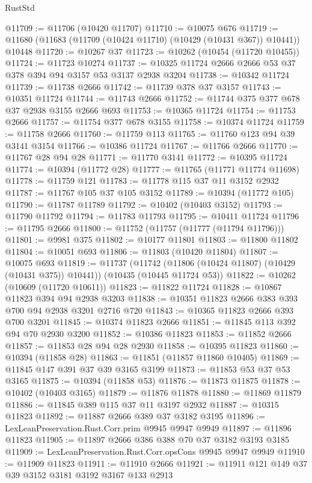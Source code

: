 \begin{lexlean}{RustStd}
\begin{coremodule}
{\begin{coremodule}
{{{{{{{{{{{{{{{{{{{{{{{{{{{{{{{{{{{{{{{{{{{{{{{{{{{{{{{{{{{{{{{{{{{{{{{{{{{{{{@11709 := @11706 (@10420 @11707)
@11710 := @10075 @676
@11719 := @11680 (@11683 (@11709 (@10424 @11710) (@10429 (@10431 @367)) @10441)) @10448
@11720 := @10267 @37
@11723 := @10262 (@10454 (@11720 @10455))
@11724 := @11723 @10274
@11737 := @10325 @11724 @2666 @2666 @53 @37 @378 @394 @94 @3157 @53 @3137 @2938 @3204
@11738 := @10342 @11724
@11739 := @11738 @2666
@11742 := @11739 @378 @37 @3157
@11743 := @10351 @11724
@11744 := @11743 @2666
@11752 := @11744 @375 @377 @678 @37 @2938 @3155 @2666 @693
@11753 := @10365 @11724
@11754 := @11753 @2666
@11757 := @11754 @377 @678 @3155
@11758 := @10374 @11724
@11759 := @11758 @2666
@11760 := @11759 @113
@11765 := @11760 @123 @94 @39 @3141 @3154
@11766 := @10386 @11724
@11767 := @11766 @2666
@11770 := @11767 @28 @94 @28
@11771 := @11770 @3141
@11772 := @10395 @11724
@11774 := @10394 (@11772 @28)
@11777 := @11765 (@11771 @11774 @11698)
@11778 := @11759 @121
@11783 := @11778 @115 @37 @11 @3152 @2932
@11787 := @11767 @105 @37 @105 @3152
@11789 := @10394 (@11772 @105)
@11790 := @11787 @11789
@11792 := @10402 (@10403 @3152)
@11793 := @11790 @11792
@11794 := @11783 @11793
@11795 := @10411 @11724
@11796 := @11795 @2666
@11800 := @11752 (@11757 (@11777 (@11794 @11796)))
@11801 := @9981 @375
@11802 := @10177 @11801
@11803 := @11800 @11802
@11804 := @10051 @693
@11806 := @11803 (@10420 @11804)
@11807 := @10075 @693
@11819 := @11737
    (@11742 (@11806 (@10424 @11807) (@10429 (@10431 @375)) @10441))
    (@10435 (@10445 @11724 @53))
@11822 := @10262 (@10609 (@11720 @10611))
@11823 := @11822 @11724
@11828 := @10867 @11823 @394 @94 @2938 @3203
@11838 := @10351 @11823 @2666 @383 @393 @700 @94 @2938 @3201 @2716 @720
@11843 := @10365 @11823 @2666 @393 @700 @3201
@11845 := @10374 @11823 @2666
@11851 := @11845 @113 @392 @94 @70 @2930 @3200
@11852 := @10386 @11823
@11853 := @11852 @2666
@11857 := @11853 @28 @94 @28 @2930
@11858 := @10395 @11823
@11860 := @10394 (@11858 @28)
@11863 := @11851 (@11857 @11860 @10405)
@11869 := @11845 @147 @391 @37 @39 @3165 @3199
@11873 := @11853 @53 @37 @53 @3165
@11875 := @10394 (@11858 @53)
@11876 := @11873 @11875
@11878 := @10402 (@10403 @3165)
@11879 := @11876 @11878
@11880 := @11869 @11879
@11886 := @11845 @389 @115 @37 @11 @3197 @2932
@11887 := @10315 @11823
@11892 := @11887 @2666 @389 @37 @3182 @3195
@11896 := LexLeanPreservation.Rust.Corr.prim @9945 @9947 @9949
@11897 := @11896 @11823
@11905 := @11897 @2666 @386 @388 @70 @37 @3182 @3193 @3185
@11909 := LexLeanPreservation.Rust.Corr.opsCons @9945 @9947 @9949
@11910 := @11909 @11823
@11911 := @11910 @2666
@11921 := @11911 @121 @149 @37 @39 @3152 @3181 @3192 @3167 @133 @2913
}}}}}}}}}}}}}}}}}}}}}}}}}}}}}}}}}}}}}}}}}}}}}}}}}}}}}}}}}}}}}}}}}}}}}}}}}}}}}}
\end{coremodule}}
\end{coremodule}
\end{lexlean}
